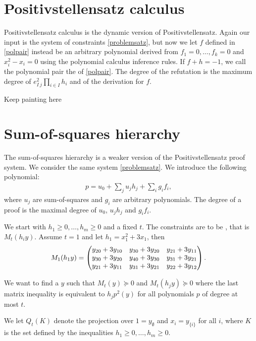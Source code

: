 \documentclass[a4paper,twoside,justified]{tufte-handout}
\begin{document}
\section{Positivstellensatz calculus\cite{grigoriev2001complexity}}
Positivstellensatz calculus is the dynamic version of Positivstellensatz. Again our input is the system of constraints \eqref{problemsatz}, but now we let $f$ defined in \eqref{polpair} instead be an arbitrary polynomial derived from $f_1=0,\ldots,f_k=0$ and $x_i^2-x_i=0$ using the polynomial calculus inference rules. If $f+h=-1$, we call the polynomial pair the  of \eqref{polpair}. The degree of the refutation is the maximum degree of $e^2_{I\ j}\prod_{i\in I}h_i$ and of the derivation for $f$.

{\Huge Keep painting here}

\section{Sum-of-squares hierarchy}
 The sum-of-squares hierarchy is a weaker version of the Positivstellensatz proof system. We consider the same system \eqref{problemsatz}. We introduce the following polynomial:
\begin{eqnarray}
\label{polsos}
p=u_0+\sum_{j}u_jh_j+\sum_ig_if_i,
\end{eqnarray}
 where $u_j$ are sum-of-squares and $g_i$ are arbitrary polynomials. The degree of a proof is the maximal degree of $u_0$, $u_jh_j$ and $g_if_i$.

We start with $h_1\geq0,\ldots,h_m\geq0$ and a fixed $t$. The constraints are to be , that is $M_t(h_iy).$ Assume $t=1$ and let $h_1=x_1^2+3x_1$, then
\begin{eqnarray*}
M_1(h_1y)=
\begin{pmatrix}
                        y_{20}+3y_{10}  & y_{30}+3y_{20}  & y_{21}+3y_{11}\cr
               y_{30}+3y_{20}  & y_{40}+3y_{30} & y_{31}+3y_{21}\cr
                 y_{21}+3y_{11} & y_{31}+3y_{21}& y_{22}+3y_{12}\cr
\end{pmatrix}.
\end{eqnarray*} 

We want to find a $y$ such that $M_t(y)\succeq0$ and $M_t(h_jy)\succeq0$ where the last matrix inequality is equivalent to $h_jp^2(y)$ for all polynomials $p$ of degree at most $t$.

We let $Q_t(K)$ denote the projection over $1=y_{\emptyset}$ and $x_i=y_{\{i\}}$ for all $i$, where $K$ is the set defined by the inequalities $h_1\geq0,\ldots,h_m\geq0$. 








\end{document}
